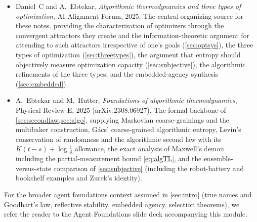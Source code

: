 \documentclass[11pt]{article}
\begin{document}
\begin{itemize}[leftmargin=2em]
  \item Daniel~C and A.~Ebtekar, \emph{Algorithmic thermodynamics and three types of optimization}, AI Alignment Forum, 2025. The central organizing source for these notes, providing the characterization of optimizers through the convergent attractors they create and the information-theoretic argument for attending to such attractors irrespective of one's goals (\cref{sec:optsys}), the three types of optimization (\cref{sec:threetypes}), the argument that entropy should objectively measure optimization capacity (\cref{sec:subjective}), the algorithmic refinements of the three types, and the embedded-agency synthesis (\cref{sec:embedded}).
  \item A.~Ebtekar and M.~Hutter, \emph{Foundations of algorithmic thermodynamics}, Physical Review E, 2025 (arXiv:2308.06927). The formal backbone of \cref{sec:secondlaw,sec:algo}, supplying Markovian coarse-grainings and the multibaker construction, G\'acs' coarse-grained algorithmic entropy, Levin's conservation of randomness and the algorithmic second law with its $K(t-s) + \log\frac1\delta$ allowance, the exact analysis of Maxwell's demon including the partial-measurement bound \eqref{eq:algTL}, and the ensemble-versus-state comparison of \cref{sec:subjective} (including the robot-battery and bookshelf examples and Zurek's identity).
\end{itemize}

For the broader agent foundations context assumed in \cref{sec:intro} (true names and Goodhart's law, reflective stability, embedded agency, selection theorems), we refer the reader to the Agent Foundations slide deck accompanying this module.
\end{document}
